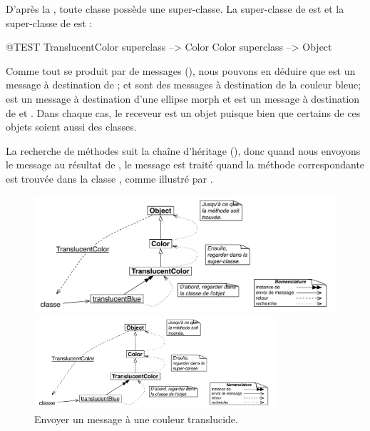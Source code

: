 \documentclass[a4paper,10pt,twoside]{book}
\begin{document}
D'après la ,
toute classe possède une super-classe.
La super-classe de  est  et la super-classe de  est :
\begin{code}{@TEST}
TranslucentColor superclass --> Color
Color superclass                          --> Object
\end{code}

Comme tout se produit par  de messages
(), nous pouvons en déduire que  est un message à destination de ;
 et  sont des messages à
destination de la couleur bleue;  est un
message à destination d'une ellipse morph et
 est un message à destination de
 et . %
Dans chaque cas, le receveur est un objet puisque \mantra bien que certains de ces objets soient aussi des classes.

La recherche de méthodes suit la chaîne d'héritage (), donc quand nous envoyons le message  au résultat de 
, le message est traité quand la méthode correspondante est trouvée dans la classe , comme illustré par .

\begin{center}
\begin{figure}[!ht]
\ifluluelse
	{\centerline{\includegraphics[width=\textwidth]{TranslucentClassMessage}}}
	{\centerline{\includegraphics[width=0.8\textwidth]{TranslucentClassMessage}}}
\caption{Envoyer un message à une couleur translucide.}
\end{figure}
\end{center}
\end{document}

